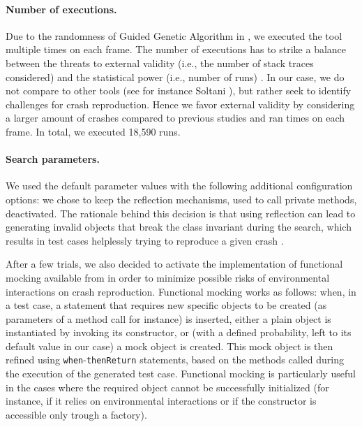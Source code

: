 \paragraph{Number of executions.}

Due to the randomness of Guided Genetic Algorithm in \evocrash, we executed the tool multiple times on each frame. 
The number of executions has to strike a balance between the threats to external validity (i.e., the number of stack traces considered) and the statistical power (i.e., number of runs) \cite{Fraser2014b, Arcuri2014}. 
In our case, we do not compare \evocrash to other tools (see for instance Soltani \etal \cite{soltani2017, Soltani2018a}), but rather seek to identify challenges for crash reproduction. 
Hence we favor external validity by considering a larger amount of crashes compared to previous studies \cite{Soltani2018a} and ran  times on each frame. In total, we executed 18,590 \evocrash runs.

\paragraph{Search parameters.}

We used the default parameter values \cite{Arcuri2011a, Fraser2014b} with the following additional configuration options: 
we chose to keep the reflection mechanisms, used to call private methods, deactivated.
The rationale behind this decision is that using reflection can lead to generating invalid objects that break the class invariant \cite{Liskov2000} during the search, which results in test cases helplessly trying to reproduce a given crash \cite{Chen2015}.

After a few trials, we also decided to activate the implementation of functional mocking available from \evosuite \cite{arcuri2017private} in order to minimize possible risks of environmental interactions on crash reproduction.
Functional mocking works as follows: when, in a test case, a statement that requires new specific objects to be created (as parameters of a method call for instance) is inserted, either a plain object is instantiated by invoking its constructor, or (with a defined probability, left to its default value in our case) a mock object is created. This mock object is then refined using \texttt{when}-\texttt{thenReturn} statements, based on the methods called during the execution of the generated test case. Functional mocking is particularly useful in the cases where the required object cannot be successfully initialized (for instance, if it relies on environmental interactions or if the constructor is accessible only trough a factory). 

